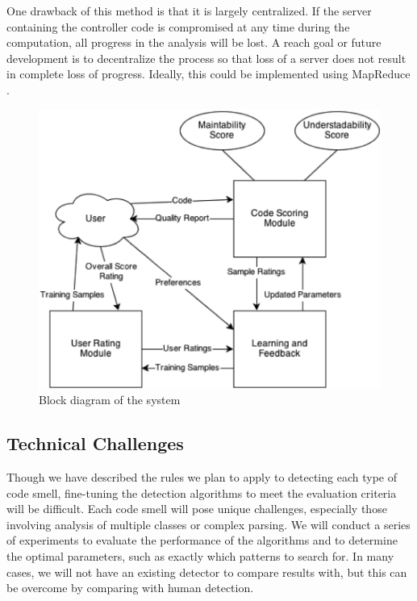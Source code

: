 \documentclass{sig-alternate}
\begin{document}
One drawback of this method is that it is largely centralized. If the server containing the controller code is compromised at any time during the computation, all progress in the analysis will be lost. A reach goal or future development is to decentralize the process so that loss of a server does not result in complete loss of progress. Ideally, this could be implemented using MapReduce \cite{dean2008mapreduce}.


\begin{figure}[htb!]
	\begin{center}
		\includegraphics[width=0.9\linewidth]{block_diagram}
	\end{center}
	\vspace{-12pt}
	\caption{Block diagram of the system}
	\label{fig:some_graph}
\end{figure}

\subsection{Technical Challenges}
\label{subsec:tech_challenges}

Though we have described the rules we plan to apply to detecting each type of code smell, fine-tuning the detection algorithms to meet the evaluation criteria will be difficult. Each code smell will pose unique challenges, especially those involving analysis of multiple classes or complex parsing. We will conduct a series of experiments to evaluate the performance of the algorithms and to determine the optimal parameters, such as exactly which patterns to search for. In many cases, we will not have an existing detector to compare results with, but this can be overcome by comparing with human detection. 
\end{document}
